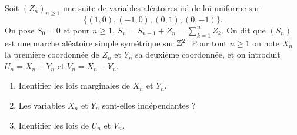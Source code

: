 \documentclass[11pt]{td_um}
\begin{document}
\begin{exo}{} %
Soit $(Z_n)_{n\geq 1}$ une suite de variables aléatoires iid de loi uniforme sur
$$\{(1,0),(-1,0),(0,1),(0,-1)\}.$$
On pose $S_0=0$ et pour $n\geq 1$, $S_n=S_{n-1}+Z_n=\sum_{k=1}^nZ_k$. On dit que $(S_n)$ est une marche aléatoire simple symétrique sur $\mathbb{Z}^2$. Pour tout $n\geq 1$ on note $X_n$ la première coordonnée de $Z_n$ et $Y_n$ sa deuxième coordonnée, et on introduit $U_n=X_n+Y_n$ et $V_n=X_n-Y_n$.
\begin{enumerate}
    \item Identifier les lois marginales de $X_n$ et $Y_n$.
    \item Les variables $X_n$ et $Y_n$ sont-elles indépendantes ?
    \item Identifier les lois de $U_n$ et $V_n$.
\end{enumerate}
\end{exo}
\end{document}
